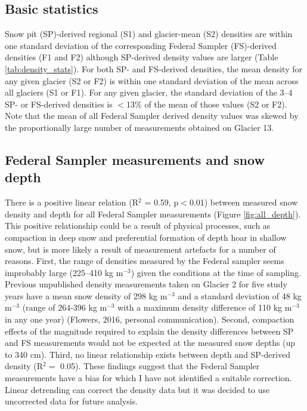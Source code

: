 \documentclass{sfuthesis}
\begin{document}
\subsection{Basic statistics}

Snow pit (SP)-derived regional (S1) and glacier-mean (S2) densities are within one standard deviation of the corresponding Federal Sampler (FS)-derived densities (F1 and F2) although SP-derived density values are larger (Table \ref{tab:density_stats}). For both SP- and FS-derived densities, the mean density for any given glacier (S2 or F2) is within one standard deviation of the mean across all glaciers (S1 or F1). For any given glacier, the standard deviation of the 3--4 SP- or FS-derived densities is $<$13\% of the mean of those values (S2 or F2). Note that the mean of all Federal Sampler derived density values was skewed by the proportionally large number of measurements obtained on Glacier 13.

\subsection{Federal Sampler measurements and snow depth}
\label{sec:FSdensity&depth}

There is a positive linear relation (R$^2$ = 0.59, p$<$0.01) between measured snow density and depth for all Federal Sampler measurements (Figure \ref{fig:all_depth}). This positive relationship could be a result of physical processes, such as compaction in deep snow and preferential formation of depth hoar in shallow snow, but is more likely a result of measurement artefacts for a number of reasons. First, the range of densities measured by the Federal sampler seems improbably large (225--410 kg m$^{-3}$) given the conditions at the time of sampling. Previous unpublished density measurements taken on Glacier 2 for five study years have a mean snow density of 298 kg m$^{-3}$ and a standard deviation of 48 kg m$^{-3}$ (range of 264-396 kg m$^{-3}$ with a maximum density difference of 110 kg m$^{-3}$ in any one year) (Flowers, 2016, personal communication). Second, compaction effects of the magnitude required to explain the density differences between SP and FS measurements would not be expected at the measured snow depths (up to 340 cm). Third, no linear relationship exists between depth and SP-derived density (R$^2 =$ 0.05). These findings suggest that the Federal Sampler measurements have a bias for which I have not identified a suitable correction. Linear detrending can correct the density data but it was decided to use uncorrected data for future analysis.
\end{document}
